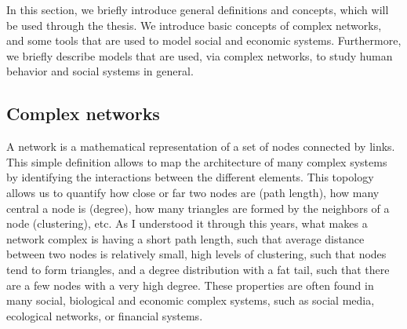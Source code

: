 In this section, we briefly introduce general definitions and concepts, which will be used through the thesis. We introduce basic concepts of complex networks, and some tools that are used to model social and economic systems. Furthermore, we briefly describe models that are used, via complex networks, to study human behavior and social systems in general.

\subsection{\label{subsec:Complex networks} Complex networks}

A network is a mathematical representation of a set of nodes connected by links. This simple definition allows to map the architecture of many complex systems by identifying the interactions between the different elements. This topology allows us to quantify how close or far two nodes are (path length), how many central a node is (degree), how many triangles are formed by the neighbors of a node (clustering), etc. As I understood it through this years, what makes a network complex is having a short path length, such that average distance between two nodes is relatively small, high levels of clustering, such that nodes tend to form triangles, and a degree distribution with a fat tail, such that there are a few nodes with a very high degree. These properties are often found in many social, biological and economic complex systems, such as social media, ecological networks, or financial systems.

